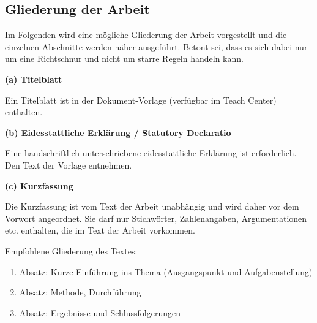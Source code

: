 


\newpage


\subsection{Gliederung der Arbeit}

Im Folgenden wird eine mögliche Gliederung der Arbeit vorgestellt und die einzelnen Abschnitte werden näher ausgeführt. Betont sei, dass es sich dabei nur um eine Richtschnur und nicht um starre Regeln handeln kann. 

\vspace{1mm}

\textbf{(a) Titelblatt}

\vspace{1mm}

Ein Titelblatt ist in der Dokument-Vorlage (verfügbar im Teach Center) enthalten.

\vspace{1,5mm}

\textbf{(b) Eidesstattliche Erklärung / Statutory Declaratio}

\vspace{1mm}

Eine handschriftlich unterschriebene eidesstattliche Erklärung ist erforderlich. Den Text der Vorlage entnehmen.

\vspace{1,5mm}

\textbf{(c) Kurzfassung}

\vspace{1mm}

Die Kurzfassung ist vom Text der Arbeit unabhängig und wird daher vor dem Vorwort angeordnet. Sie darf nur Stichwörter, Zahlenangaben, Argumentationen etc. enthalten, die im Text der Arbeit vorkommen.

\vspace{1mm}

Empfohlene Gliederung des Textes:
\begin{enumerate}
    \item Absatz: Kurze Einführung ins Thema (Ausgangspunkt und Aufgabenstellung)
    \item Absatz: Methode, Durchführung
    \item Absatz: Ergebnisse und Schlussfolgerungen
\end{enumerate}

